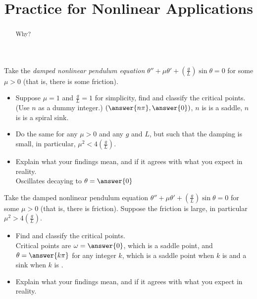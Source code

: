 \documentclass{ximera}
\title{Practice for Nonlinear Applications}
\begin{document}
\begin{abstract}
Why?
\end{abstract}
\maketitle


\begin{exercise}
    Take the \emph{damped nonlinear pendulum equation} $\theta '' + \mu \theta' + (\frac{g}{L}) \sin \theta = 0$ for some $\mu > 0$ (that is, there is some friction).
    \begin{itemize}
        \item Suppose $\mu = 1$ and $\frac{g}{L} = 1$ for simplicity, find and classify the critical points.\\
            (Use $n$ as a dummy integer.) $\left(\answer{n \pi}, \answer{0}\right)$, $n$ is  is a saddle, $n$ is  is a spiral sink.
        \item Do the same for any $\mu > 0$ and any $g$ and $L$, but such that the damping is small, in particular, $\mu^2 < 4(\frac{g}{L})$.
        \item Explain what your findings mean, and if it agrees with what you expect in reality.\\
            Oscillates decaying to $\theta = \answer{0}$
    \end{itemize}
\end{exercise}

\begin{exercise}%
    Take the damped nonlinear pendulum equation $\theta '' + \mu \theta' + (\frac{g}{L}) \sin \theta = 0$ for some $\mu > 0$ (that is, there is friction). Suppose the friction is large, in particular $\mu^2 > 4 (\frac{g}{L})$.
    \begin{itemize}
        \item Find and classify the critical points.\\
            Critical points are $\omega = \answer{0}$, which is a saddle point, and $\theta= \answer{k\pi}$ for any integer $k$, which is a saddle point when $k$ is  and a sink when $k$ is .
        \item Explain what your findings mean, and if it agrees with what you expect in reality.
    \end{itemize}
\end{exercise}
\end{document}
